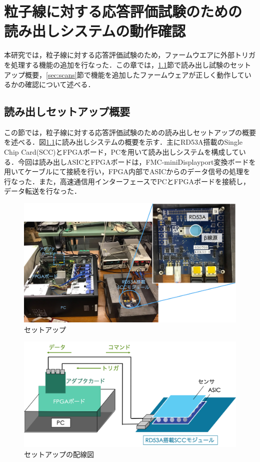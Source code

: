 \chapter{粒子線に対する応答評価試験のための\\読み出しシステムの動作確認}
本研究では，粒子線に対する応答評価試験のため，ファームウエアに外部トリガを処理する機能の追加を行なった．この章では，\ref{sec:setup}節で読み出し試験のセットアップ概要，\ref{sec:scans}節で機能を追加したファームウェアが正しく動作しているかの確認について述べる．

\section{読み出しセットアップ概要}
\label{sec:setup}
この節では，粒子線に対する応答評価試験のための読み出しセットアップの概要を述べる．図\ref{fig:setup}に読み出しシステムの概要を示す．主にRD53A搭載のSingle Chip Card(SCC)とFPGAボード，PCを用いて読み出しシステムを構成している．今回は読み出しASICとFPGAボードは，FMC-miniDisplayport変換ボードを用いてケーブルにて接続を行い，FPGA内部でASICからのデータ信号の処理を行なった．また，高速通信用インターフェースでPCとFPGAボードを接続し，データ転送を行なった．\par

\begin{figure}[h]
  \centering
  \includegraphics[width=15cm]{./figure/Setup.png}
  \caption{セットアップ}
  \label{fig:setup}
\end{figure}

\begin{figure}[h]
  \centering
  \includegraphics[width=12cm]{./figure/setupcab.png}
  \caption{セットアップの配線図}
  \label{fig:setupcab}
\end{figure}

